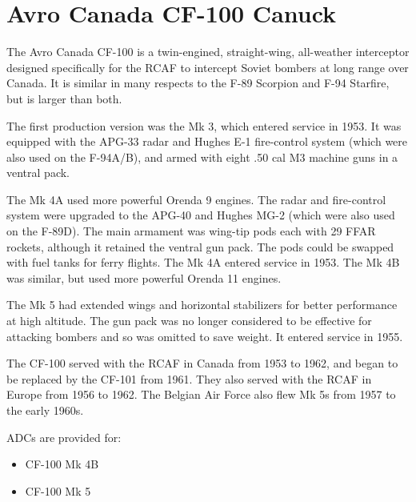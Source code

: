 \section*{Avro Canada CF-100 Canuck}

The Avro Canada CF-100 is a twin-engined, straight-wing, all-weather interceptor designed specifically for the RCAF to intercept Soviet bombers at long range over Canada. It is similar in many respects to the F-89 Scorpion and F-94 Starfire, but is larger than both.

The first production version was the Mk 3, which entered service in 1953. It was equipped with the APG-33 radar and Hughes E-1 fire-control system (which were also used on the F-94A/B), and armed with eight .50 cal M3 machine guns in a ventral pack.

The Mk 4A used more powerful Orenda 9 engines. The radar and fire-control system were upgraded to the APG-40 and Hughes MG-2 (which were also used on the F-89D). The main armament was wing-tip pods each with 29 FFAR rockets, although it retained the ventral gun pack. The pods could be swapped with fuel tanks for ferry flights. The Mk 4A entered service in 1953. The Mk 4B was similar, but used more powerful Orenda 11 engines.

The Mk 5 had extended wings and horizontal stabilizers for better performance at high altitude. The gun pack was no longer considered to be effective for attacking bombers and so was omitted to save weight. It entered service in 1955.

The CF-100 served with the RCAF in Canada from 1953 to 1962, and began to be replaced by the CF-101 from 1961. They also served with the RCAF in Europe from 1956 to 1962. The Belgian Air Force also flew Mk 5s from 1957 to the early 1960s.

ADCs are provided for:
\begin{itemize}
\item CF-100 Mk 4B
\item CF-100 Mk 5
\end{itemize}
